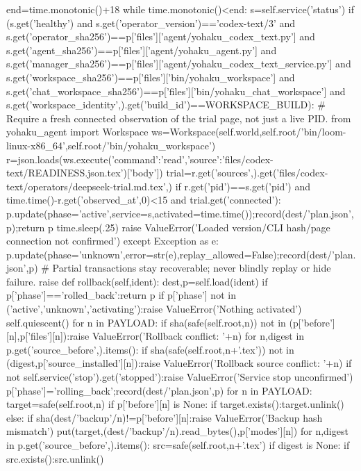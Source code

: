    end=time.monotonic()+18
   while time.monotonic()<end:
    s=self.service('status')
    if (s.get('healthy') and s.get('operator_version')=='codex-text/3'
      and s.get('operator_sha256')==p['files']['agent/yohaku_codex_text.py']
      and s.get('agent_sha256')==p['files']['agent/yohaku_agent.py']
      and s.get('manager_sha256')==p['files']['agent/yohaku_codex_text_service.py']
      and s.get('workspace_sha256')==p['files']['bin/yohaku_workspace']
      and s.get('chat_workspace_sha256')==p['files']['bin/yohaku_chat_workspace']
      and s.get('workspace_identity',{}).get('build_id')==WORKSPACE_BUILD):
     # Require a fresh connected observation of the trial page, not just a live PID.
     from yohaku_agent import Workspace
     ws=Workspace(self.world,self.root/'bin/loom-linux-x86_64',self.root/'bin/yohaku_workspace')
     r=json.loads(ws.execute({'command':'read','source':'files/codex-text/READINESS.json.tex'})['body'])
     trial=r.get('sources',{}).get('files/codex-text/operators/deepseek-trial.md.tex',{})
     if r.get('pid')==s.get('pid') and time.time()-r.get('observed_at',0)<15 and trial.get('connected'):
      p.update(phase='active',service=s,activated=time.time());record(dest/'plan.json',p);return p
    time.sleep(.25)
   raise ValueError('Loaded version/CLI hash/page connection not confirmed')
  except Exception as e:
   p.update(phase='unknown',error=str(e),replay_allowed=False);record(dest/'plan.json',p)
   # Partial transactions stay recoverable; never blindly replay or hide failure.
   raise
 def rollback(self,ident):
  dest,p=self.load(ident)
  if p['phase']=='rolled_back':return p
  if p['phase'] not in ('active','unknown','activating'):raise ValueError('Nothing activated')
  self.quiescent()
  for n in PAYLOAD:
   if sha(safe(self.root,n)) not in (p['before'][n],p['files'][n]):raise ValueError('Rollback conflict: '+n)
  for n,digest in p.get('source_before',{}).items():
   if sha(safe(self.root,n+'.tex')) not in (digest,p['source_installed'][n]):raise ValueError('Rollback source conflict: '+n)
  if not self.service('stop').get('stopped'):raise ValueError('Service stop unconfirmed')
  p['phase']='rolling_back';record(dest/'plan.json',p)
  for n in PAYLOAD:
   target=safe(self.root,n)
   if p['before'][n] is None:
    if target.exists():target.unlink()
   else:
    if sha(dest/'backup'/n)!=p['before'][n]:raise ValueError('Backup hash mismatch')
    put(target,(dest/'backup'/n).read_bytes(),p['modes'][n])
  for n,digest in p.get('source_before',{}).items():
   src=safe(self.root,n+'.tex')
   if digest is None:
    if src.exists():src.unlink()
